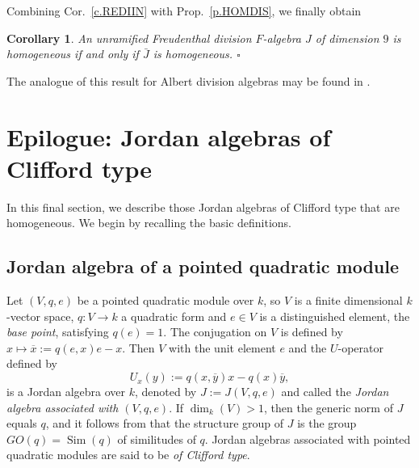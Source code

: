 \documentclass{amsart}
\newtheorem{cor}[equation]{Corollary}
\theoremstyle{definition} %
\theoremstyle{remark} %
\DeclareMathOperator{\Sim}{Sim}
\renewcommand{\:}{\colon\,}
\numberwithin{equation}{section}
\begin{document}
Combining Cor.~\ref{c.REDIIN} with Prop.~\ref{p.HOMDIS}, we finally obtain

\begin{cor} \label{c.UNFRHO} 
An unramified Freudenthal division $F$-algebra $J$ of dimension $9$ is homogeneous if and only if $\bar J$ is homogeneous. \hfill $\square$	
\end{cor}

The analogue of this result for Albert division algebras may be found in \cite[Thm.~6]{MR0379620}. %

\section{Epilogue: Jordan algebras of Clifford type}\label{quadratic}
In this final section, we describe those Jordan algebras of Clifford type that are homogeneous. We begin by recalling the basic definitions.

\subsection{Jordan algebra of a pointed quadratic module} \label{ss.JOQUAM}
Let $(V, q, e)$ be a pointed quadratic module over $k$, %
so $V$ is a finite dimensional $k$-vector space, $q:V\rightarrow k$ a quadratic form and $e\in V$ is a distinguished element, the \emph{base point}, satisfying $q(e)=1$. The conjugation on $V$ is defined by $x\mapsto\overline{x}:= q(e,x)e-x$. 
Then $V$ with the unit element $e$ and the $U$-operator defined by 
$$U_x(y) := q(x, \overline{y})x-q(x)\overline{y},$$
is a Jordan algebra over $k$, denoted by $J := J(V,q,e)$ and called the \emph{Jordan algebra associated with $(V,q,e)$}. If $\dim_k(V) > 1$, then the generic norm of $J$ equals $q$, and it follows from \cite[Exc.~31.34~(c)]{MR4806163} that the structure group of $J$ is the group $GO(q)=\Sim(q)$ of similitudes of $q$. Jordan algebras associated with pointed quadratic modules are said to be \emph{of Clifford type}.
\end{document}
